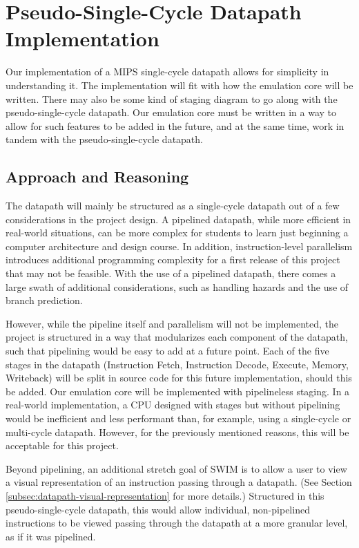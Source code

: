 \documentclass[parskip=half, fontsize=12pt]{scrartcl}
\let\oldsection\section
\renewcommand\section{\newpage\oldsection}
\begin{document}
\section{Pseudo-Single-Cycle Datapath Implementation}

Our implementation of a MIPS single-cycle datapath allows for simplicity
in understanding it. The implementation will fit with how the emulation
core will be written. There may also be some kind of staging diagram to
go along with the pseudo-single-cycle datapath. Our emulation core must
be written in a way to allow for such features to be added in the
future, and at the same time, work in tandem with the
pseudo-single-cycle datapath.

\subsection{Approach and Reasoning}

The datapath will mainly be structured as a single-cycle datapath out of
a few considerations in the project design. A pipelined datapath, while
more efficient in real-world situations, can be more complex for
students to learn just beginning a computer architecture and design
course. In addition, instruction-level parallelism introduces additional
programming complexity for a first release of this project that may not
be feasible. With the use of a pipelined datapath, there comes a large
swath of additional considerations, such as handling hazards and the use
of branch prediction.

However, while the pipeline itself and parallelism will not be
implemented, the project is structured in a way that modularizes each
component of the datapath, such that pipelining would be easy to add at
a future point. Each of the five stages in the datapath (Instruction
Fetch, Instruction Decode, Execute, Memory, Writeback) will be split in
source code for this future implementation, should this be added. Our
emulation core will be implemented with pipelineless staging. In a
real-world implementation, a CPU designed with stages but without
pipelining would be inefficient and less performant than, for example,
using a single-cycle or multi-cycle datapath. However, for the
previously mentioned reasons, this will be acceptable for this project.

Beyond pipelining, an additional stretch goal of SWIM is to allow a user
to view a visual representation of an instruction passing through a
datapath. (See Section \ref{subsec:datapath-visual-representation} for more details.)
Structured in this pseudo-single-cycle datapath, this would allow
individual, non-pipelined instructions to be viewed passing through the
datapath at a more granular level, as if it was pipelined.
\end{document}
